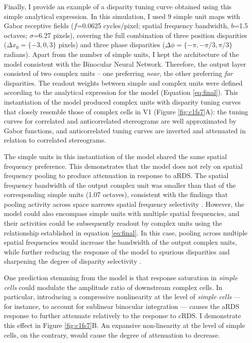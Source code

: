 Finally, I provide an example of a disparity tuning curve obtained using this simple analytical expression. In this simulation, I used 9 simple unit maps with Gabor receptive fields ($f$=0.0625 cycles/pixel; spatial frequency bandwidth, $b$=1.5 octaves; $\sigma$=6.27 pixels), covering the full combination of three position disparities ($\Delta x_0 = \{-3, 0, 3\}$ pixels) and three phase disparities ($\Delta \phi = \{-\pi, -\pi/3, \pi/3\}$ radians). Apart from the number of simple units, I kept the architecture of the model consistent with the Binocular Neural Network. Therefore, the output layer consisted of two complex units -- one preferring \textit{near}, the other preferring \textit{far} disparities. The readout weights between simple and complex units were defined according to the analytical expression for the model (Equation \ref{eq:final}). This instantiation of the model produced complex units with disparity tuning curves that closely resemble those of complex cells in V1 (Figure \ref{fig:c1fs7}A): the tuning curves for correlated and anticorrelated stereograms are well approximated by Gabor functions, and anticorrelated tuning curves are inverted and attenuated in relation to correlated stereograms. 

The simple units in this instantiation of the model shared the same spatial frequency preference. This demonstrates that the model does not rely on spatial frequency pooling to produce attenuation in response to aRDS. The spatial frequency bandwidth of the output complex unit was smaller than that of the corresponding simple units (1.07 octaves), consistent with the findings that pooling activity across space narrows spatial frequency selectivity \cite{Kato:2016fk}. However, the model could also encompass simple units with multiple spatial frequencies, and their activities could be subsequently readout by complex units using the relationship established in equation \ref{eq:final}. In this case, pooling across multiple spatial frequencies would increase the bandwidth of the output complex units, while further reducing the response of the model to spurious disparities \cite{Fleet:1996tq} and sharpening the degree of disparity selectivity \cite{Baba:2015ij,Kato:2016fk}. 

One prediction stemming from the model is that response saturation in \textit{simple cells} could modulate the amplitude ratio of downstream complex cells. In particular, introducing a compressive nonlinearity at the level of \textit{simple cells} --- for instance, to account for sublinear binocular integration \cite{Longordo2013} --- causes the aRDS response to further attenuate relatively to the response to cRDS. I demonstrate this effect in Figure \ref{fig:c1fs7}B. An expansive non-linearity at the level of simple cells, on the contrary, would cause the degree of attenuation to decrease.

